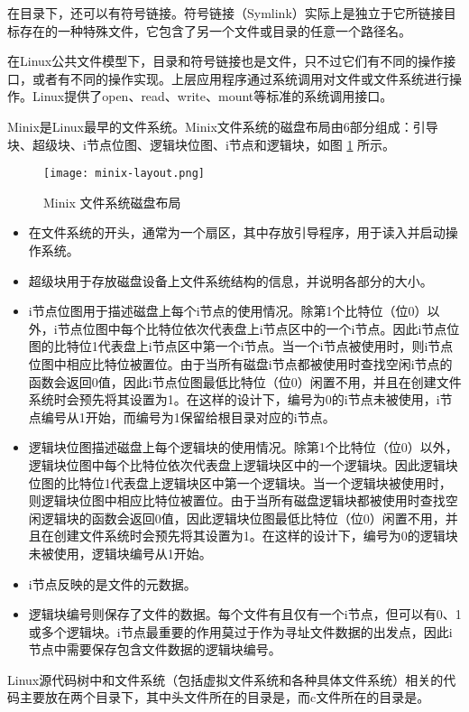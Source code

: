 在目录下，还可以有符号链接。符号链接（Symlink）实际上是独立于它所链接目标存在的一种特殊文件，它包含了另一个文件或目录的任意一个路径名。

在Linux公共文件模型下，目录和符号链接也是文件，只不过它们有不同的操作接口，或者有不同的操作实现。上层应用程序通过系统调用对文件或文件系统进行操作。Linux提供了open、read、write、mount等标准的系统调用接口。

Minix是Linux最早的文件系统。Minix文件系统的磁盘布局由6部分组成：引导块、超级块、i节点位图、逻辑块位图、i节点和逻辑块，如图 \ref{fig:minix-layout} 所示。

\begin{figure}[ht]
	\centering
	\texttt{[image: minix-layout.png]}
	\caption{Minix 文件系统磁盘布局}
	\label{fig:minix-layout}
\end{figure}

\begin{itemize}
	\item 在文件系统的开头，通常为一个扇区，其中存放引导程序，用于读入并启动操作系统。
	\item 超级块用于存放磁盘设备上文件系统结构的信息，并说明各部分的大小。
	\item i节点位图用于描述磁盘上每个i节点的使用情况。除第1个比特位（位0）以外，i节点位图中每个比特位依次代表盘上i节点区中的一个i节点。因此i节点位图的比特位1代表盘上i节点区中第一个i节点。当一个i节点被使用时，则i节点位图中相应比特位被置位。由于当所有磁盘i节点都被使用时查找空闲i节点的函数会返回0值，因此i节点位图最低比特位（位0）闲置不用，并且在创建文件系统时会预先将其设置为1。在这样的设计下，编号为0的i节点未被使用，i节点编号从1开始，而编号为1保留给根目录对应的i节点。
	\item 逻辑块位图描述磁盘上每个逻辑块的使用情况。除第1个比特位（位0）以外，逻辑块位图中每个比特位依次代表盘上逻辑块区中的一个逻辑块。因此逻辑块位图的比特位1代表盘上逻辑块区中第一个逻辑块。当一个逻辑块被使用时，则逻辑块位图中相应比特位被置位。由于当所有磁盘逻辑块都被使用时查找空闲逻辑块的函数会返回0值，因此逻辑块位图最低比特位（位0）闲置不用，并且在创建文件系统时会预先将其设置为1。在这样的设计下，编号为0的逻辑块未被使用，逻辑块编号从1开始。
	\item i节点反映的是文件的元数据。
	\item 逻辑块编号则保存了文件的数据。每个文件有且仅有一个i节点，但可以有0、1或多个逻辑块。i节点最重要的作用莫过于作为寻址文件数据的出发点，因此i节点中需要保存包含文件数据的逻辑块编号。
\end{itemize}

Linux源代码树中和文件系统（包括虚拟文件系统和各种具体文件系统）相关的代码主要放在两个目录下，其中头文件所在的目录是，而c文件所在的目录是。

